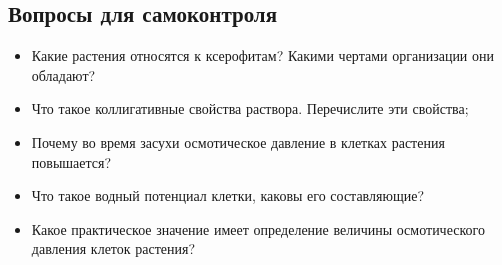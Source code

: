 \subsection*{Вопросы для самоконтроля}

	\begin{itemize}
		\item Какие растения относятся к \hypertarget{xserofites}{ксерофитам}? Какими чертами организации они обладают?
		\item Что такое коллигативные свойства раствора. Перечислите эти свойства;
		\item Почему во время засухи осмотическое давление в клетках растения повышается?
		\item Что такое водный потенциал клетки, каковы его составляющие?
		\item Какое практическое значение имеет определение величины осмотического давления клеток растения?
 	
	\end{itemize}





